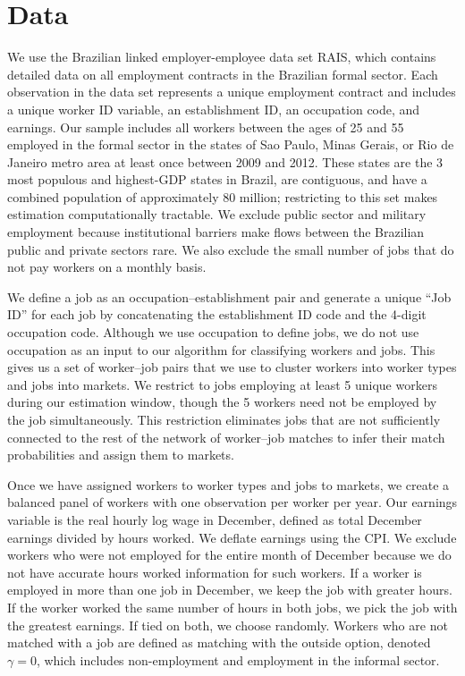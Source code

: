 \documentclass[12pt]{article}
\def\g{\gamma}
\theoremstyle{definition}
\theoremstyle{plain}
\begin{document}
\section{Data} 
\label{sec:data}

We use the Brazilian linked employer-employee data set RAIS, which contains detailed data on all employment contracts in the Brazilian formal sector. Each observation in the data set represents a unique employment contract and includes a unique worker ID variable, an establishment ID, an occupation code, and earnings. Our sample includes all workers between the ages of 25 and 55 employed in the formal sector in the states of Sao Paulo, Minas Gerais, or Rio de Janeiro metro area at least once between 2009 and 2012. These states are the 3 most populous and highest-GDP states in Brazil, are contiguous, and have a combined population of approximately 80 million; restricting to this set makes estimation computationally tractable.  We exclude public sector and military employment because institutional barriers make flows between the Brazilian public and private sectors rare. We also exclude the small number of jobs that do not pay workers on a monthly basis.

We define a job as an occupation--establishment pair and generate a unique ``Job ID'' for each job by concatenating the establishment ID code and the 4-digit occupation code.  Although we use occupation to define jobs, we do not use occupation as an input to our algorithm for classifying workers and jobs. This gives us a set of worker--job pairs that we use to cluster workers into worker types and jobs into markets. We restrict to jobs employing at least 5 unique workers during our estimation window, though the 5 workers need not be employed by the job simultaneously. This restriction eliminates jobs that are not sufficiently connected to the rest of the network of worker--job matches to infer their match probabilities and assign them to markets. 


Once we have assigned workers to worker types and jobs to markets, we create a balanced panel of workers with one observation per worker per year. Our earnings variable is the real hourly log wage in December, defined as total December earnings divided by hours worked. We deflate earnings using the CPI. We exclude workers who were not employed for the entire month of December because we do not have accurate hours worked information for such workers. If a worker is employed in more than one job in December, we keep the job with greater hours. If the worker worked the same number of hours in both jobs, we pick the job with the greatest earnings. If tied on both, we choose randomly. Workers who are not matched with a job are defined as matching with the outside option, denoted $\g=0$, which includes non-employment and employment in the informal sector. 
\end{document}
